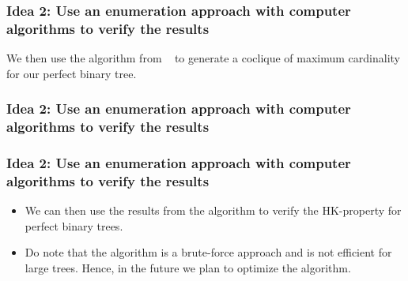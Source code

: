 \documentclass[10pt,]{beamer}
\theoremstyle{conjectureStyle}
\theoremstyle{notationStyle}
\theoremstyle{claimStyle}
\begin{document}
\begin{frame}\frametitle{Idea 2: Use an enumeration approach with computer algorithms to verify the results}
    We then use the algorithm from ~\cite{Niskanen2003CliquerUG} to generate a coclique of maximum cardinality for our perfect binary tree.

    \begin{algorithm}[H]


    \end{algorithm}
\end{frame}

\begin{frame}\frametitle{Idea 2: Use an enumeration approach with computer algorithms to verify the results}
    \begin{algorithm}[H]


    \end{algorithm}
\end{frame}

\begin{frame}\frametitle{Idea 2: Use an enumeration approach with computer algorithms to verify the results}
    \begin{itemize}
        \item We can then use the results from the algorithm to verify the HK-property for perfect binary trees.
        \item Do note that the algorithm is a brute-force approach and is not efficient for large trees. Hence, in the future we plan to optimize the algorithm.
    \end{itemize}
\end{frame}
\end{document}

